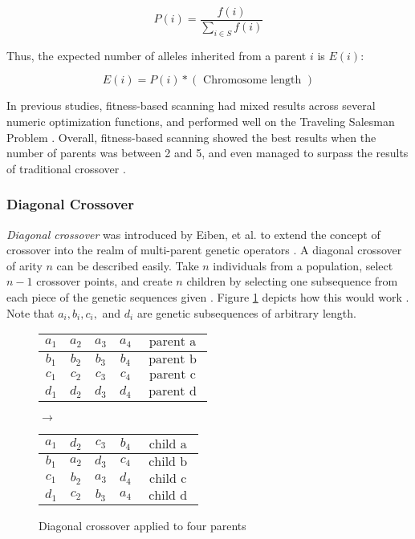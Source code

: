 \[ P(i) = \frac{f(i)}{\sum\limits_{i \in S} f(i)} \]

\noindent Thus, the expected number of alleles inherited from a parent $i$ is $E(i)$\cite{Eiben94}:

\[ E(i) = P(i) *(\text{ Chromosome length }) \]

In previous studies, fitness-based scanning had mixed results across several numeric optimization functions, and performed well on the Traveling Salesman Problem \cite{Eiben94, Eiben95}. Overall, fitness-based scanning showed the best results when the number of parents was between 2 and 5, and even managed to surpass the results of traditional crossover \cite{Eiben94}. 

\subsubsection*{Diagonal Crossover}
\emph{Diagonal crossover} was introduced by Eiben, et al. to extend the concept of crossover into the realm of multi-parent genetic operators \cite{Eiben03}. A diagonal crossover of arity $n$ can be described easily. Take $n$ individuals from a population, select $n-1$ crossover points, and create $n$ children by selecting one subsequence from each piece of the genetic sequences given \cite{Eiben95}. Figure \ref{DC-Fig} depicts how this would work \cite{Eiben95}. Note that $a_i, b_i, c_i,$ and $d_i$ are genetic subsequences of arbitrary length.
\begin{figure}[h!]
\centering
\begin{tabular}{ | c | c | c | c | c | }
\hline
{\color{myred}$a_1$} & {\color{myred}$a_2$} & {\color{myred}$a_3$} & {\color{myred}$a_4$} & $\text{ parent a }$ 	\\ \hline
{\color{myblue}$b_1$} & {\color{myblue}$b_2$} & {\color{myblue}$b_3$} & {\color{myblue}$b_4$} & $\text{ parent b }$ 	\\ \hline
{\color{mygreen}$c_1$} & {\color{mygreen}$c_2$} & {\color{mygreen}$c_3$} & {\color{mygreen}$c_4$} & $\text{ parent c }$ 	\\ \hline
$d_1$ & $d_2$ & $d_3$ & $d_4$ & $\text{ parent d }$ 	\\ \hline
\end{tabular}
$\rightarrow$
\begin{tabular}{ | c | c | c | c | c | }
\hline
{\color{myred}$a_1$} & $d_2$ & {\color{mygreen}$c_3$} & {\color{myblue}$b_4$} & $\text{ child a }$ 	\\ \hline
{\color{myblue}$b_1$} & {\color{myred}$a_2$} & $d_3$ & {\color{mygreen}$c_4$} & $\text{ child b }$ 	\\ \hline
{\color{mygreen}$c_1$} & {\color{myblue}$b_2$} & {\color{myred}$a_3$} & $d_4$ & $\text{ child c }$ 	\\ \hline
$d_1$ & {\color{mygreen}$c_2$} & {\color{myblue}$b_3$} & {\color{myred}$a_4$} & $\text{ child d }$ 	\\ \hline
\end{tabular}
\caption{Diagonal crossover applied to four parents}
\label{DC-Fig}
\end{figure} 

